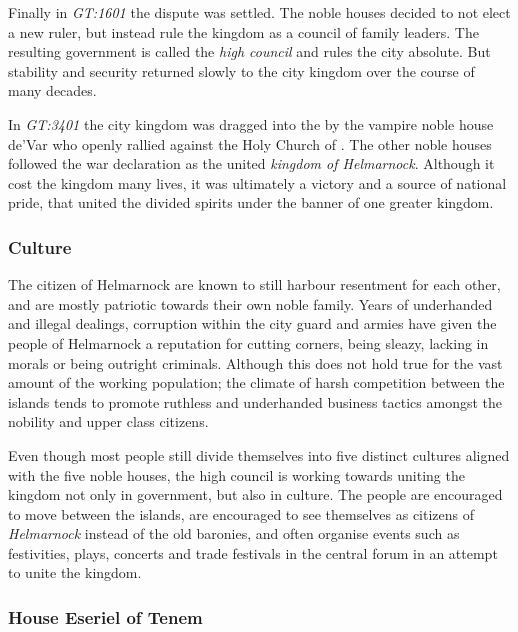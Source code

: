 Finally in \emph{GT:1601} the dispute was settled. The noble houses decided
to not elect a new ruler, but instead rule the kingdom as a council of family
leaders. The resulting government is called the \emph{high council} and rules
the city absolute. But stability and security returned slowly to the city
kingdom over the course of many decades.

In \emph{GT:3401} the city kingdom was dragged into the  by the vampire noble house de'Var who openly rallied against the
Holy Church of . The other noble houses followed the war
declaration as the united \emph{kingdom of Helmarnock}. Although it cost the
kingdom many lives, it was ultimately a victory and a source of national
pride, that united the divided spirits under the banner of one greater
kingdom.

\subsubsection{Culture}


The citizen of Helmarnock are known to still harbour resentment for each other,
and are mostly patriotic towards their own noble family. Years of underhanded
and illegal dealings, corruption within the city guard and armies have given
the people of Helmarnock a reputation for cutting corners, being sleazy,
lacking in morals or being outright criminals. Although this does not hold
true for the vast amount of the working population; the climate of harsh
competition between the islands tends to promote ruthless and underhanded
business tactics amongst the nobility and upper class citizens.

Even though most people still divide themselves into five distinct cultures
aligned with the five noble houses, the high council is working towards
uniting the kingdom not only in government, but also in culture. The people
are encouraged to move between the islands, are encouraged to see themselves
as citizens of \emph{Helmarnock} instead of the old baronies, and often organise
events such as festivities, plays, concerts and trade festivals in the central
forum in an attempt to unite the kingdom.

\subsubsection{House Eseriel of Tenem}
\label{sec:House Eseriel}

